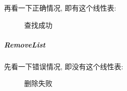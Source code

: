 \documentclass[supercite]{Experimental_Report}
\theoremstyle{definition}
\begin{document}
\noindent
再看一下正确情况, 即有这个线性表:
\begin{figure}[htbp]
	\centering
	\centering
	\caption{查找成功}
	\label{fig2-9}
\end{figure}

\clearpage
\subparagraph{RemoveList}
\noindent
先看一下错误情况, 即没有这个线性表:
\begin{figure}[htbp]
	\centering
	\centering
	\caption{删除失败}
	\label{fig2-10}
\end{figure}
\end{document}
